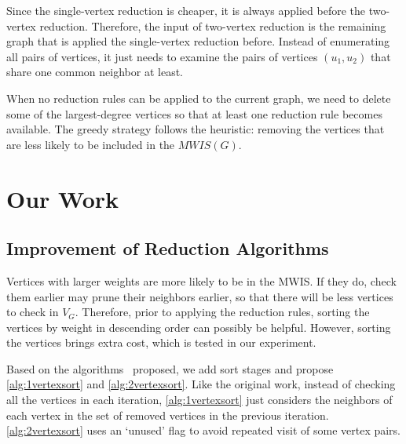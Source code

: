 \documentclass[sigconf, nonacm]{acmart}
\begin{document}
Since the single-vertex reduction is cheaper, it is always applied before the two-vertex reduction. Therefore, the input of two-vertex reduction is the remaining graph that is applied the single-vertex reduction before. Instead of enumerating all pairs of vertices, it just needs to examine the pairs of vertices $(u_1, u_2)$ that share one common neighbor at least.

When no reduction rules can be applied to the current graph, we need to delete some of the largest-degree vertices so that at least one reduction rule becomes available. The greedy strategy follows the heuristic: removing the vertices that are less likely to be included in the $MWIS(G)$.

\section{Our Work}

\subsection{Improvement of Reduction Algorithms}

Vertices with larger weights are more likely to be in the MWIS. If they do, check them earlier may prune their neighbors earlier, so that there will be less vertices to check in $V_G$. Therefore, prior to applying the reduction rules, sorting the vertices by weight in descending order can possibly be helpful. However, sorting the vertices brings extra cost, which is tested in our experiment. 

Based on the algorithms~\citet{Zheng:2020aa} proposed, we add sort stages and propose \autoref{alg:1vertexsort} and \autoref{alg:2vertexsort}. Like the original work, instead of checking all the vertices in each iteration, \autoref{alg:1vertexsort} just considers the neighbors of each vertex in the set of removed vertices in the previous iteration. \autoref{alg:2vertexsort} uses an `unused' flag to avoid repeated visit of some vertex pairs.
\end{document}
